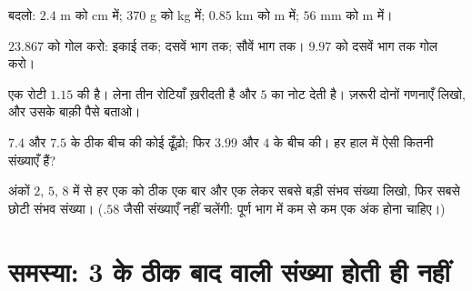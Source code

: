 \begin{exercise}[$\star$]\label{exo:g6:decimals:8}
बदलो: $2.4$ m को cm में; \quad $370$ g को kg में; \quad $0.85$ km
को m में; \quad $56$ mm को m में।
\end{exercise}

\begin{exercise}[$\star$]\label{exo:g6:decimals:9}
$23.867$ को गोल करो: इकाई तक; दसवें भाग तक; सौवें भाग तक।
$9.97$ को दसवें भाग तक गोल करो।
\end{exercise}

\begin{exercise}[$\star\star$]\label{exo:g6:decimals:10}
एक रोटी $1.15$ की है। लेना तीन रोटियाँ ख़रीदती है और $5$ का नोट
देती है। ज़रूरी दोनों गणनाएँ लिखो, और उसके बाक़ी पैसे बताओ।
\end{exercise}

\begin{exercise}[$\star\star$]\label{exo:g6:decimals:11}
$7.4$ और $7.5$ के ठीक बीच की कोई  ढूँढ़ो; फिर $3.99$
और $4$ के बीच की। हर हाल में ऐसी कितनी संख्याएँ हैं?
\end{exercise}

\begin{exercise}[$\star\star\star$]\label{exo:g6:decimals:12}
अंकों $2$, $5$, $8$ में से हर एक को ठीक एक बार और एक 
लेकर सबसे बड़ी संभव संख्या लिखो, फिर सबसे छोटी संभव संख्या।
($.58$ जैसी संख्याएँ नहीं चलेंगी: पूर्ण भाग में कम से कम एक अंक
होना चाहिए।)
\end{exercise}

\section{समस्या: 3 के ठीक बाद वाली संख्या होती ही नहीं}


